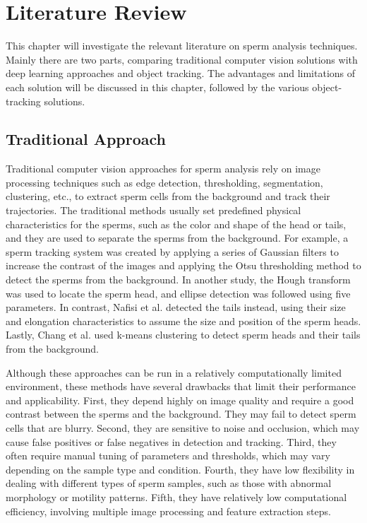 \chapter{Literature Review}\label{lit}
This chapter will investigate the relevant literature on sperm analysis techniques. Mainly there are two parts, comparing traditional computer vision solutions with deep learning approaches and object tracking. The advantages and limitations of each solution will be discussed in this chapter, followed by the various object-tracking solutions. 
\newpage
\section{Traditional Approach}
Traditional computer vision approaches for sperm analysis rely on image processing techniques such as edge detection, thresholding, segmentation, clustering, etc., to extract sperm cells from the background and track their trajectories. The traditional methods usually set predefined physical characteristics for the sperms, such as the color and shape of the head or tails, and they are used to separate the sperms from the background. For example, a sperm tracking system was created by applying a series of Gaussian filters to increase the contrast of the images and applying the Otsu thresholding method to detect the sperms from the background. \cite{trad1} In another study, the Hough transform was used to locate the sperm head, and ellipse detection was followed using five parameters. \cite{trad2} In contrast, Nafisi et al. detected the tails instead, using their size and elongation characteristics to assume the size and position of the sperm heads. \cite{trad3} Lastly, Chang et al. used k-means clustering to detect sperm heads and their tails from the background. \cite{trad4} 

Although these approaches can be run in a relatively computationally limited environment, these methods have several drawbacks that limit their performance and applicability. First, they depend highly on image quality and require a good contrast between the sperms and the background. They may fail to detect sperm cells that are blurry. Second, they are sensitive to noise and occlusion, which may cause false positives or false negatives in detection and tracking. Third, they often require manual tuning of parameters and thresholds, which may vary depending on the sample type and condition. Fourth, they have low flexibility in dealing with different types of sperm samples, such as those with abnormal morphology or motility patterns. Fifth, they have relatively low computational efficiency, involving multiple image processing and feature extraction steps.

